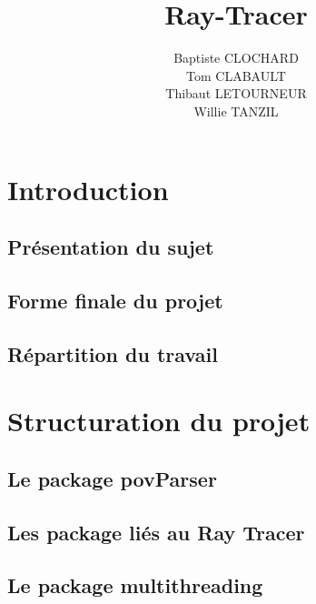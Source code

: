 \documentclass[11pt]{article}
\author{Baptiste CLOCHARD \\
    Tom CLABAULT\\
    Thibaut LETOURNEUR\\
    Willie TANZIL}
\title{Ray-Tracer}
\date{}
\begin{document}
\maketitle
\newpage
\tableofcontents
\newpage

\maketitle

\section{Introduction}

    \subsection{Présentation du sujet}
        
    \subsection{Forme finale du projet}
        
    \subsection{Répartition du travail}
        

%

\section{Structuration du projet}
        \subsection{Le package povParser}
        \subsection{Les package liés au Ray Tracer}
            

        \subsection{Le package multithreading}
	  
\end{document}
